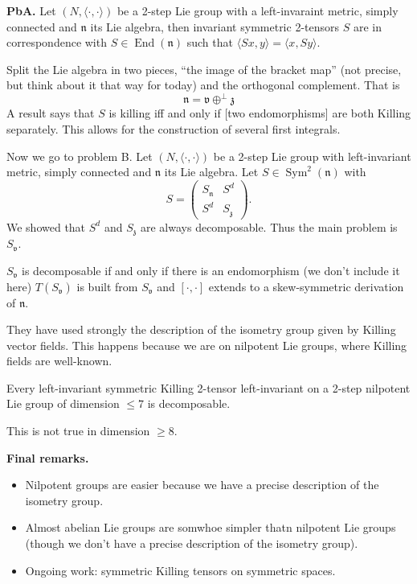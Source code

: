 \medskip\noindent
{\bf PbA.}
Let  $(N,\langle\cdot,\cdot\rangle)$
be a 2-step Lie group with a left-invaraint
metric,
simply connected and $\mathfrak{n}$ 
its Lie algebra, then
invariant symmetric 2-tensors $S$
are in correspondence with $S \in
\operatorname{End}(\mathfrak{n})$
such that $\langle Sx,y\rangle=
\langle x,Sy\rangle$.

Split the Lie algebra in two pieces,
``the image of the bracket map''
(not precise, but think about it that way
for today)
and the orthogonal complement.
That is
$$
\mathfrak{n}=\mathfrak{v}\oplus^\perp 
\mathfrak{z}
$$
A result says that $S$ is killing
iff and only if [two endomorphisms]
are both Killing separately.
This allows for the construction of several
first integrals.

Now we go to problem B.
Let $(N,\langle\cdot, \cdot \rangle)$
be a 2-step Lie group with left-invariant
metric, simply connected and
$\mathfrak{n}$ its Lie algebra. Let $S \in
\operatorname{Sym}^2(\mathfrak{n})$
with
$$
S = \begin{pmatrix}S_{\mathfrak{n}}&
S^d\\ S^d&S_{\mathfrak{z}}\end{pmatrix}.
$$
We showed that $S^d$ and $S_{\mathfrak{z}}$
are always decomposable.
Thus the main problem is $S_{\mathfrak{v}}$.
\begin{theorem}
\label{theorem-decomposable-sv}
$S_{\mathfrak{v}}$ is decomposable
if and only if there is an endomorphism
(we don't include it here)
$T(S_{\mathfrak{v}})$ is built from
$S_{\mathfrak{v}}$ and $[\cdot,\cdot]$
extends to a skew-symmetric derivation of
$\mathfrak{n}$.
\end{theorem}

\noindent
They have used strongly the description
of the isometry group given by
Killing vector fields. This happens
because we are on nilpotent Lie groups,
where Killing fields are well-known.

\begin{corollary}
\label{lemma-left-invariant-killing2}
Every left-invariant symmetric Killing
2-tensor left-invariant on a 2-step
nilpotent Lie group
of dimension $\leq 7$ is decomposable.
\end{corollary}

\noindent
This is not true in dimension $\geq 8$.

\medskip\noindent
{\bf Final remarks.} 
\begin{itemize}
\item Nilpotent groups are easier
because we have a precise description of the
isometry group.

\item Almost abelian Lie groups are somwhoe
simpler
thatn nilpotent Lie groups (though we
don't have a precise description of the
isometry group).

\item Ongoing work: symmetric Killing tensors
on symmetric spaces.
\end{itemize}

